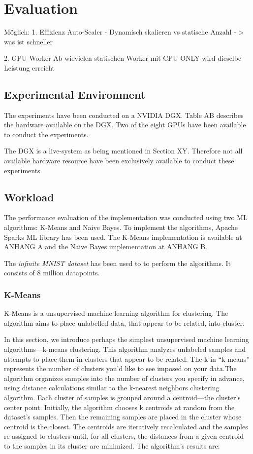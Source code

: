 \chapter{Evaluation}
\label{chap:07_evaluation}
%

Möglich:
1. Effizienz Auto-Scaler
- Dynamisch skalieren vs statische Anzahl - > was ist schneller

2. GPU Worker
Ab wievielen statischen Worker mit CPU ONLY wird dieselbe Leistung erreicht

\section{Experimental Environment}
The experiments have been conducted on a NVIDIA DGX.
Table AB describes the hardware available on the DGX.
Two of the eight GPUs have been available to conduct the experiments.


The DGX is a live-system as being mentioned in Section XY. Therefore not all available hardware resource have been exclusively available to conduct these experiments.

\section{Workload}
The performance evaluation of the implementation was conducted using two ML algorithms: K-Means and Naive Bayes.
To implement the algorithms, Apache Sparks ML library has been used. The K-Means implementation is available at ANHANG A and the Naive Bayes implementation at ANHANG B.


The \textit{infinite MNIST dataset}\cite{loosli2006InfiniteMNIST} has been used to to perform the algorithms. It consists of  8 million datapoints.


\subsection{K-Means}
K-Means is a unsupervised machine learning algorithm for clustering.
The algorithm aims to place unlabelled data, that appear to be related, into cluster.


In this section, we introduce perhaps the simplest unsupervised machine learning algorithms—k-means clustering. This algorithm analyzes unlabeled samples and attempts to place them in clusters that appear to be related. The k in “k-means” represents the number of clusters you’d like to see imposed on your data.The algorithm organizes samples into the number of clusters you specify in advance, using distance calculations similar to the k-nearest neighbors clustering algorithm. Each cluster of samples is grouped around a centroid—the cluster’s center point. Initially, the algorithm chooses k centroids at random from the dataset’s samples. Then the remaining samples are placed in the cluster whose centroid is the closest. The centroids are iteratively recalculated and the samples re-assigned to clusters until, for all clusters, the distances from a given centroid to the samples in its cluster are minimized. The algorithm’s results are:


